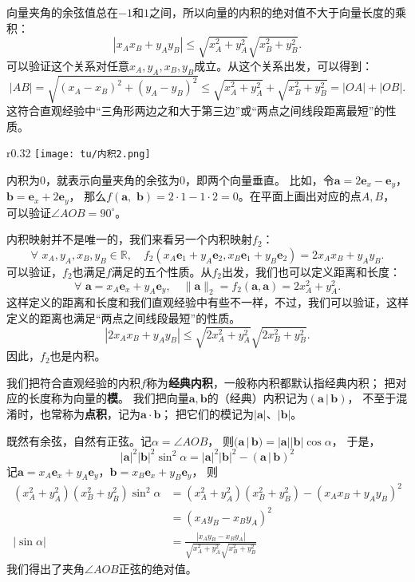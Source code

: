 \documentclass[12pt,UTF8]{ctexbook}
\theoremstyle{definition}
\theoremstyle{plain}
\begin{document}
向量夹角的余弦值总在$-1$和$1$之间，所以向量的内积的绝对值不大于向量长度的乘积：
$$ |x_Ax_B + y_Ay_B| \leqslant \sqrt{x_A^2 + y_A^2} \sqrt{x_B^2 + y_B^2}.$$
可以验证这个关系对任意$x_A, y_A, x_B, y_B$成立。从这个关系出发，可以得到：
$$ |AB| = \sqrt{(x_A - x_B)^2 + (y_A - y_B)^2} \leqslant \sqrt{x_A^2 + y_A^2} + \sqrt{x_B^2 + y_B^2} = |OA| + |OB|.$$
这符合直观经验中“三角形两边之和大于第三边”或“两点之间线段距离最短”的性质。

\begin{wrapfigure}[8]{r}{0.32\textwidth} 
    \vspace{-16pt}
    \flushright
    \texttt{[image: tu/内积2.png]}
\end{wrapfigure}

内积为$0$，就表示向量夹角的余弦为$0$，即两个向量垂直。
比如，令$\mathbf{a} = 2\mathbf{e}_x - \mathbf{e}_y$，$\mathbf{b} = \mathbf{e}_x + 2\mathbf{e}_y$，
那么$f(\mathbf{a}, \,\, \mathbf{b}) = 2\cdot 1 - 1\cdot 2 = 0$。在平面上画出对应的点$A,B$，
可以验证$\angle AOB = 90^\circ$。

内积映射并不是唯一的，我们来看另一个内积映射$f_2$：
$$ \forall \,\, x_A, y_A, x_B, y_B \in \mathbb{R}, \quad f_2(x_A\mathbf{e}_1 + y_A\mathbf{e}_2, x_B\mathbf{e}_1 + y_B\mathbf{e}_2) = 2x_Ax_B + y_A y_B.$$
可以验证，$f_2$也满足$f$满足的五个性质。从$f_2$出发，我们也可以定义距离和长度：
$$ \forall \,\, \mathbf{a} = x_A\mathbf{e}_x + y_A\mathbf{e}_y, \quad \| \mathbf{a} \|_2 = f_2(\mathbf{a}, \mathbf{a}) = 2x_A^2 + y_A^2. $$
这样定义的距离和长度和我们直观经验中有些不一样，不过，我们可以验证，这样定义的距离也满足“两点之间线段最短”的性质。
$$ |2x_Ax_B + y_Ay_B| \leqslant \sqrt{2x_A^2 + y_A^2} \sqrt{2x_B^2 + y_B^2}.$$
因此，$f_2$也是内积。

我们把符合直观经验的内积$f$称为\textbf{经典内积}，一般称内积都默认指经典内积；
把对应的长度称为向量的\textbf{模}。
我们把向量$\mathbf{a}, \mathbf{b}$的（经典）内积记为$(\mathbf{a}\, | \, \mathbf{b})$，
不至于混淆时，也常称为\textbf{点积}，记为$\mathbf{a} \cdot \mathbf{b}$；
把它们的模记为$|\mathbf{a}|$、$|\mathbf{b}|$。

既然有余弦，自然有正弦。记$\alpha = \angle AOB$，
则$(\mathbf{a}\, | \, \mathbf{b}) = |\mathbf{a}||\mathbf{b}| \cos \alpha$，
于是，
$$ |\mathbf{a}|^2|\mathbf{b}|^2 \sin^2 \alpha = |\mathbf{a}|^2|\mathbf{b}|^2 - (\mathbf{a}\, | \, \mathbf{b})^2 $$
记$\mathbf{a} = x_A\mathbf{e}_x + y_A\mathbf{e}_y$，$\mathbf{b} = x_B\mathbf{e}_x + y_B\mathbf{e}_y$，
则
\begin{align*}
    (x_A^2 + y_A^2)(x_B^2 + y_B^2) \sin^2 \alpha &= (x_A^2 + y_A^2)(x_B^2 + y_B^2) - (x_Ax_B + y_Ay_B)^2  \\
    &= (x_Ay_B - x_By_A)^2  \\
    |\sin \alpha| &= \frac{|x_Ay_B - x_By_A|}{\sqrt{x_A^2 + y_A^2} \sqrt{x_B^2 + y_B^2}} 
\end{align*}
我们得出了夹角$\angle AOB$正弦的绝对值。
\end{document}
